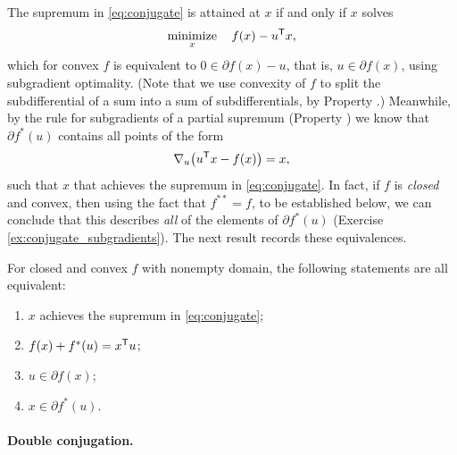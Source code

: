 The supremum in \eqref{eq:conjugate} is attained at $x$ if and only if $x$
solves  
\[
\operatorname*{minimize}_x \quad f(x) - u^{\mathsf{T}} x,
\]
which for convex $f$ is equivalent to $0 \in \partial f(x) - u$, that is, $u \in 
\partial f(x)$, using subgradient optimality. (Note that we use convexity 
of $f$ to split the subdifferential of a sum into a sum of subdifferentials, by 
Property .)  Meanwhile, by the rule for subgradients
of a partial supremum (Property ) we know that
$\partial f^*(u)$ contains all points of the form 
\[
\nabla_u \big( u^{\mathsf{T}} x - f(x) \big) = x,
\]
such that $x$ that achieves the supremum in \eqref{eq:conjugate}. In fact, if
$f$ is \emph{closed} and convex, then using the fact that $f^{**} = f$, to be 
established below, we can conclude that this describes \emph{all} of the
elements of $\partial f^*(u)$ (Exercise \ref{ex:conjugate_subgradients}). The 
next result records these equivalences. 

\begin{Theorem}
\label{thm:conjugate_subgradients}
For closed and convex $f$ with nonempty domain, the following statements are all 
equivalent:
\begin{enumerate}[label=(\roman*)]
\item $x$ achieves the supremum in \eqref{eq:conjugate};
\item $f(x) + f^*(u) = x^{\mathsf{T}} u$;
\item $u \in \partial f(x)$;
\item $x \in \partial f^*(u)$.
\end{enumerate}
\end{Theorem}
\vspace{-3pt}

\paragraph{Double conjugation.}

